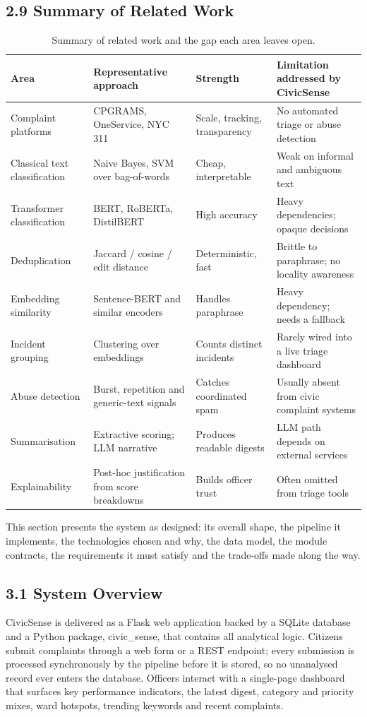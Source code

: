 \documentclass[10pt,letterpaper,oneside]{article}\usepackage{geometry}\geometry{top=1in,bottom=1in,left=1in,right=1in,includeheadfoot}\usepackage{xcolor}\definecolor{color@navy}{HTML}{1F3B63}\definecolor{color@grey}{HTML}{404040}\definecolor{color@hdr}{HTML}{F2F4F7}\usepackage{titlesec}\titleformat{\section}  {\normalfont\huge\bfseries\color@navy}  {}{0pt}{\MakeUppercase}\titleformat{\subsection}  {\normalfont\Large\bfseries\color@navy}  {}{0pt}{}\titleformat{\subsubsection}  {\normalfont\large\bfseries\color@navy}  {}{0pt}{}\titlespacing*{\section}{0pt}{14pt}{6pt}\titlespacing*{\subsection}{0pt}{10pt}{4pt}\titlespacing*{\subsubsection}{0pt}{8pt}{3pt}\setlength{\parindent}{0pt}\setlength{\parskip}{0.6em}\parindent=0pt\usepackage{enumitem}\setlist{nosep,leftmargin=*,itemsep=0pt,topsep=2pt,partopsep=0pt}\usepackage{array}\usepackage{booktabs}\usepackage{caption}\captionsetup{font={small,it},labelfont={bf},labelsep=period,  parskip=2pt,skip=4pt,list=no}\captionsetup[table]{labelfont={bf,small,color@navy},name=Table}\usepackage{graphicx}\usepackage{verbatim}\usepackage{ragged2e}\usepackage{longtable}\usepackage{tabularx}\usepackage{multirow}\usepackage{colortbl}\definecolor{rowshade}{HTML}{F2F4F7}\usepackage{tikz}\usetikzlibrary{positioning,calc}\usepackage[hidelinks]{hyperref}\hypersetup{colorlinks=true,linkcolor=color@navy,urlcolor=color@navy}\pagestyle{fancy}\fancyhf{}\renewcommand{\headrulewidth}{0.4pt}\fancyhead[L]{\small\color@navy CivicSense — Project Report}\fancyhead[R]{\small\color@grey October 11, 2026}\fancyfoot[C]{\small\color@grey An Integrated Intelligent Triage Pipelin}\fancyfoot[R]{\small\color@grey Page \thepage}\usepackage{setspace}\setstretch{1.15}\AtBeginDocument{  \hypersetup{pdftitle={An Integrated Intelligent Triage Pipeline for AI-Enhanced Citizen Complaint Management},    pdfauthor={CivicSense Project Team},    pdfsubject={Project Report},    pdfkeywords={smart cities, NLP, complaint management, e-governance},    pdfcreator={CivicSense Project Team}  }}
\begin{document}
\subsection*{2.9 Summary of Related Work}
\begin{table}[htbp]
\centering
\small
\begin{tabular}{@{}llll@{}}
\toprule
Area & Representative approach & Strength & Limitation addressed by CivicSense \\
\midrule
Complaint platforms & CPGRAMS, OneService, NYC 311 & Scale, tracking, transparency & No automated triage or abuse detection \\
Classical text classification & Naive Bayes, SVM over bag-of-words & Cheap, interpretable & Weak on informal and ambiguous text \\
Transformer classification & BERT, RoBERTa, DistilBERT & High accuracy & Heavy dependencies; opaque decisions \\
Deduplication & Jaccard / cosine / edit distance & Deterministic, fast & Brittle to paraphrase; no locality awareness \\
Embedding similarity & Sentence-BERT and similar encoders & Handles paraphrase & Heavy dependency; needs a fallback \\
Incident grouping & Clustering over embeddings & Counts distinct incidents & Rarely wired into a live triage dashboard \\
Abuse detection & Burst, repetition and generic-text signals & Catches coordinated spam & Usually absent from civic complaint systems \\
Summarisation & Extractive scoring; LLM narrative & Produces readable digests & LLM path depends on external services \\
Explainability & Post-hoc justification from score breakdowns & Builds officer trust & Often omitted from triage tools \\
\bottomrule
\end{tabular}
\caption{Summary of related work and the gap each area leaves open.}
\end{table}

\clearpage
{}

This section presents the system as designed: its overall shape, the pipeline it implements, the technologies chosen and why, the data model, the module contracts, the requirements it must satisfy and the trade-offs made along the way.

\subsection*{3.1 System Overview}
CivicSense is delivered as a Flask web application backed by a SQLite database and a Python package, civic_sense, that contains all analytical logic. Citizens submit complaints through a web form or a REST endpoint; every submission is processed synchronously by the pipeline before it is stored, so no unanalysed record ever enters the database. Officers interact with a single-page dashboard that surfaces key performance indicators, the latest digest, category and priority mixes, ward hotspots, trending keywords and recent complaints.
\end{document}
